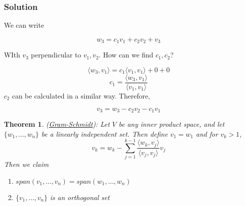 \documentclass{article}
\newtheorem{theorem}{Theorem}[section]
\newtheorem{one minute paper}[theorem]{One Minute Paper}
\begin{document}
\subsubsection*{Solution}

We can write 

\begin{equation}
    w_3 = c_1v_1 + c_2v_2 + v_3
\end{equation}

WIth $v_3$ perpendicular to $v_1, v_2$. How can we find $c_1, c_2$? 

\begin{equation}
    \langle w_3, v_1 \rangle = c_1\langle v_1, v_1 \rangle + 0 + 0
\end{equation}
\begin{equation}
    c_1 = \frac{\langle w_3, v_1 \rangle}{\langle v_1, v_1 \rangle}
\end{equation}
$c_2$ can be calculated in a similar way. Therefore, 

\begin{equation}
    v_3 = w_3 - c_2v_2 - c_1v_1
\end{equation}

\begin{theorem}
    (\underline{Gram-Schmidt}): Let $V$ be any inner product space, and let $\{w_1, \dots, w_n\}$ be a linearly independent set. 
    Then define $v_1 = w_1$ and for $v_k > 1$, 
    \begin{equation}
        v_k = w_k - \sum_{j=1}^{k-1}\frac{\langle w_k, v_j \rangle }{\langle v_j, v_j \rangle}v_j 
    \end{equation}
    Then we claim
    \begin{enumerate}
        \item $span(v_1,\dots,v_n) = span(w_1, \dots, w_n)$
        \item $\{v_1,\dots,v_n\}$ is an orthogonal set 
    \end{enumerate}
\end{theorem}
\end{document}
